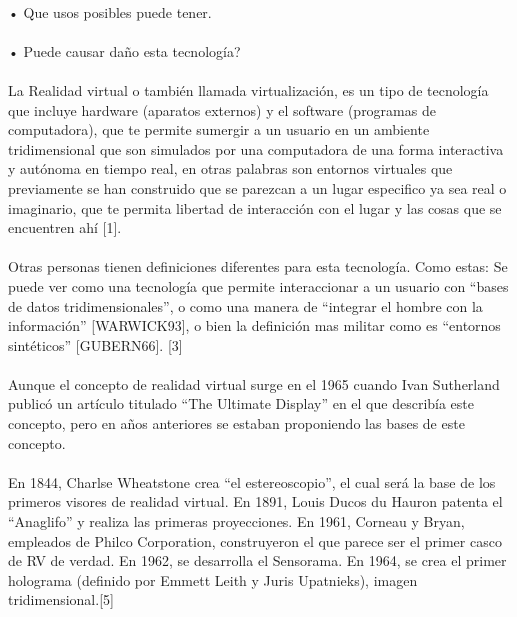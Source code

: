 \documentclass{bmcart}
\begin{document}
\paragraph{}
•	Que usos posibles puede tener.
\paragraph{}
•	Puede causar daño esta tecnología?
\paragraph{}
La Realidad virtual o también llamada virtualización, es un tipo de tecnología que incluye hardware (aparatos externos) y el software (programas de computadora), que te permite sumergir a un usuario en un ambiente tridimensional que son simulados por una computadora de una forma interactiva y autónoma en tiempo real, en otras palabras son entornos virtuales que previamente se han construido que se parezcan a un lugar especifico ya sea real o imaginario, que te permita libertad de interacción con el lugar y las cosas que se encuentren ahí [1].
\paragraph{}
Otras personas tienen definiciones diferentes para esta tecnología. Como estas: Se puede ver como una tecnología que permite interaccionar a un usuario con “bases de datos tridimensionales”, o como una manera de “integrar el hombre con la información” [WARWICK93], o bien la definición mas militar como es “entornos sintéticos” [GUBERN66]. [3]
\paragraph{}
Aunque el concepto de realidad virtual surge en el 1965 cuando Ivan Sutherland publicó un artículo titulado “The Ultimate Display” en el que describía este concepto, pero en años anteriores se estaban  proponiendo las bases de este concepto.
\paragraph{}
En 1844, Charlse Wheatstone crea “el estereoscopio”, el cual será la base de los primeros visores de realidad virtual.
En 1891, Louis Ducos du Hauron patenta el “Anaglifo” y realiza las primeras proyecciones.
En 1961, Corneau y Bryan, empleados de Philco Corporation, construyeron el que parece ser el primer casco de RV de verdad.
En 1962, se desarrolla el Sensorama.
En 1964, se crea el primer holograma (definido por Emmett Leith y Juris Upatnieks), imagen tridimensional.[5]
\end{document}
